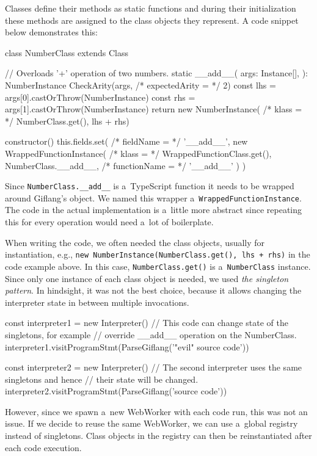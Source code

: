 Classes define their methods as static functions and during their initialization these methods are assigned to the class objects they represent.
A code snippet below demonstrates this:
\begin{code}
class NumberClass extends Class {
    // Overloads '+' operation of two numbers.
    static __add__(
        args: Instance[],
    ): NumberInstance {
        CheckArity(args, /* expectedArity = */ 2)
        const lhs = args[0].castOrThrow(NumberInstance)
        const rhs = args[1].castOrThrow(NumberInstance)
        return new NumberInstance(
            /* klass = */ NumberClass.get(), lhs + rhs)
    }

    constructor() {
        this.fields.set(
            /* fieldName = */ '__add__',
            new WrappedFunctionInstance(
                /* klass = */ WrappedFunctionClass.get(),
                NumberClass.__add__,
                /* functionName = */ '__add__'
            )
        )
    }
}
\end{code}

Since \texttt{NumberClass.\_\_add\_\_} is a~TypeScript function it needs to be wrapped around Giflang's object. We named this wrapper a~\texttt{WrappedFunctionInstance}.
The code in the actual implementation is a~little more abstract since repeating this for every operation would need a~lot of boilerplate.

When writing the code, we often needed the class objects, usually for instantiation, e.g.,
\texttt{new NumberInstance(NumberClass.get(), lhs + rhs)} in the code example above. In this case, \texttt{NumberClass.get()} is a~\texttt{NumberClass} instance. Since only one
instance of each class object is needed, we used \emph{the singleton pattern}. In hindsight, it was not the best choice, because it allows changing
the interpreter state in between multiple invocations.
\begin{code}
const interpreter1 = new Interpreter()
// This code can change state of the singletons, for example
// override __add__ operation on the NumberClass.
interpreter1.visitProgramStmt(ParseGiflang('"evil" source code'))

const interpreter2 = new Interpreter()
// The second interpreter uses the same singletons and hence
// their state will be changed.
interpreter2.visitProgramStmt(ParseGiflang('source code'))
\end{code}

However, since we spawn a~new WebWorker with each code run, this was not an issue. If we decide to reuse the same WebWorker, we can use a~global registry
instead of singletons. Class objects in the registry can then be reinstantiated after each code execution.

